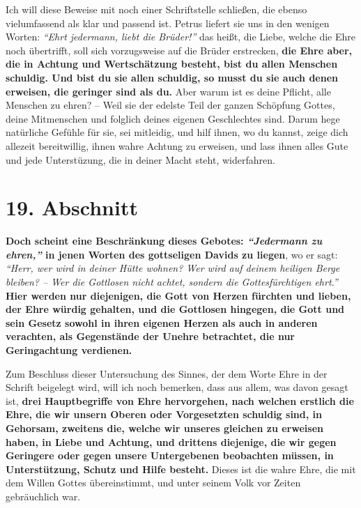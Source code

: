 Ich will diese Beweise mit noch einer Schriftstelle schließen, die ebenso
vielumfassend als klar und passend ist. Petrus liefert sie uns in den
wenigen Worten:
\textit{"`Ehrt jedermann, liebt die Brüder!"'}
das heißt, die Liebe, welche die Ehre noch übertrifft, soll sich vorzugsweise
auf die
Brüder erstrecken, \label{ref:09_18_ehre}
\textbf{die Ehre aber, die in Achtung und Wertschätzung besteht,
bist du allen Menschen schuldig. Und bist du sie allen schuldig, so musst du sie
auch denen erweisen, die geringer sind als du. } Aber warum
ist es deine Pflicht,
alle Menschen zu ehren? -- Weil sie der edelste Teil der ganzen Schöpfung
Gottes, deine Mitmenschen und folglich deines eigenen Geschlechtes sind. Darum
hege natürliche Gefühle für sie, sei mitleidig, und hilf ihnen, wo du kannst,
zeige dich allezeit bereitwillig, ihnen wahre Achtung zu erweisen, und lass
ihnen
alles Gute und jede Unterstüzung, die in deiner Macht steht, widerfahren.

\section{19. Abschnitt} \label{kap9_ab19}

 \label{ref:09_19_ehre}
\textbf{Doch scheint eine Beschränkung dieses Gebotes:
\textit{"`Jedermann zu ehren,"'} in jenen
Worten des gottseligen Davids zu liegen}, wo er sagt:
\textit{"`Herr, wer wird
in deiner Hütte wohnen? Wer wird auf deinem heiligen Berge bleiben? -- Wer die
Gottlosen nicht achtet, sondern die Gottesfürchtigen ehrt."'}
\textbf{Hier werden nur diejenigen, die Gott von Herzen fürchten und lieben, der
Ehre würdig gehalten, und die Gottlosen
hingegen,
die Gott und sein Gesetz
sowohl in ihren eigenen Herzen als auch in anderen verachten, als Gegenstände
der
Unehre betrachtet, die nur Geringachtung verdienen.}

\medskip

Zum Beschluss dieser Untersuchung des Sinnes, der dem Worte Ehre in der Schrift
beigelegt wird, will ich noch bemerken, dass aus allem, was davon gesagt ist,
\textbf{drei Hauptbegriffe von Ehre hervorgehen, nach welchen erstlich die Ehre,
die wir
unsern Oberen oder Vorgesetzten schuldig sind, in Gehorsam, zweitens die, welche
wir unseres gleichen zu erweisen haben, in Liebe und Achtung, und drittens
diejenige, die wir gegen Geringere oder gegen unsere Untergebenen beobachten
müssen, in Unterstützung, Schutz und Hilfe besteht.} Dieses ist die wahre Ehre,
die mit dem Willen Gottes übereinstimmt, und unter seinem Volk vor Zeiten
gebräuchlich war.

